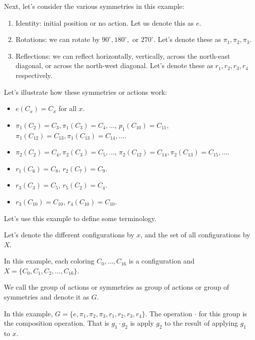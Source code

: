 \documentclass[11pt,twoside]{scrartcl}
\begin{document}
Next, let's consider the various symmetries in this example:
\begin{enumerate}
    \item Identity: initial position or no action. Let us denote this as $e$.
    \item Rotations: we can rotate by $90^\circ, 180^\circ,$ or $270^\circ$. Let's denote these as $\pi_1, \pi_2, \pi_3$.
    \item Reflections: we can reflect horizontally, vertically, across the north-east diagonal, or across the north-west diagonal. Let's denote these as $r_1, r_2, r_3, r_4$ respectively.
\end{enumerate}
Let's illustrate how these symmetries or actions work:
\begin{itemize}
    \item $e(C_x) = C_x$ for all $x$.
    \item $\pi_1(C_2) = C_3, \pi_1(C_3) = C_4, \ldots$, $p_1(C_{10}) = C_{11}$, $\pi_1(C_{12}) = C_{13}, \pi_1(C_{13}) = C_{14}, \ldots$.
    \item $\pi_2(C_2) = C_4, \pi_2(C_3) = C_5, \ldots$, $\pi_2(C_{12}) = C_{14}, \pi_2(C_{13}) = C_{15}, \ldots$.
    \item $r_1(C_6) = C_8$, $r_2(C_7) = C_9$.
    \item $r_3(C_3) = C_5$, $r_5(C_2) = C_4$.
    \item $r_3(C_{10}) = C_{10}$, $r_4(C_{10}) = C_{10}$.  
\end{itemize}

Let's use this example to define some terminology.

\begin{definition}[Set $X$]
    Let's denote the different configurations by $x$, and the set of all configurations by $X$.
\end{definition}
In this example, each coloring $C_0, \ldots, C_{16}$ is a configuration and $X = \{C_0, C_1, C_2, \ldots, C_{16}\}$.

\begin{definition}
We call the group of actions or symmetries as group of actions or group of symmetries and denote it as $G$.    
\end{definition}

In this example, $G = \{e, \pi_1, \pi_2, \pi_3, r_1, r_2, r_3, r_4 \}$. The operation $\cdot$ for this group is the composition operation. That is $g_1 \cdot g_2$ is apply $g_2$ to the result of applying $g_1$ to $x$.
\end{document}
